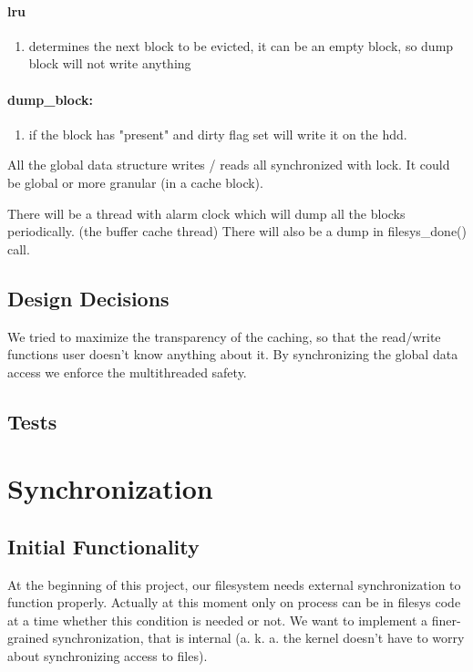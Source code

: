 \paragraph {lru}
\begin{enumerate}
	\item determines the next block to be evicted, it can be an empty block, so dump block will not write anything
\end{enumerate}

\paragraph {dump\_block:}
\begin{enumerate}
	\item if the block has "present" and dirty flag set will write it on the hdd.
\end{enumerate}

All the global data structure writes / reads all synchronized with lock. It could be global or more granular (in a cache block).

There will be a thread with alarm clock which will dump all the blocks periodically.  (the buffer cache thread)
There will also be a dump in  filesys\_done() call.


\subsection{Design Decisions}

We tried to maximize the transparency of the caching, so that the read/write functions user doesn't know anything about it. By synchronizing the global data access we enforce the multithreaded safety.


\subsection{Tests}


\section{Synchronization}
\subsection{Initial Functionality}

At the beginning of this project, our filesystem needs external synchronization to function properly. Actually at this moment only on process can be in filesys code at a time whether this condition is needed or not. We want to implement a finer-grained synchronization, that is internal (a. k. a. the kernel doesn't have to worry about synchronizing access to files).
  

